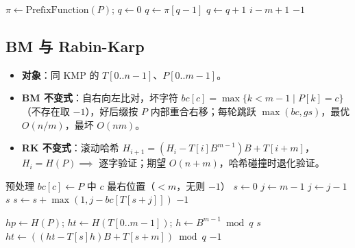 \begin{algorithm}[H]
\caption{KMP 匹配规约}
\begin{algorithmic}[1]
    \State $\pi\gets\text{PrefixFunction}(P)$; $q\gets0$
         $q\gets\pi[q-1]$ \EndWhile
         $q\gets q+1$ \EndIf
         \Return $i-m+1$  \EndIf
    \EndFor
    \State \Return $-1$
\EndProcedure
\end{algorithmic}
\end{algorithm}

\subsection{BM 与 Rabin-Karp}
\begin{itemize}
    \item \textbf{对象}：同 KMP 的 $T[0..n-1]$、$P[0..m-1]$。
    \item \textbf{BM 不变式}：自右向左比对，坏字符 $bc[c] = \max\{k < m-1 \mid P[k]=c\}$（不存在取 $-1$），好后缀按 $P$ 内部重合右移；每轮跳跃 $\max(bc, gs)$，最优 $O(n/m)$，最坏 $O(nm)$。
    \item \textbf{RK 不变式}：滚动哈希 $H_{i+1} = (H_i - T[i]B^{m-1})B + T[i+m]$，$H_i = H(P) \implies$ 逐字验证；期望 $O(n+m)$，哈希碰撞时退化验证。
\end{itemize}

\begin{algorithm}[H]
\caption{BM 坏字符规约}
\begin{algorithmic}[1]
\State 预处理 $bc[c]\gets P$ 中 $c$ 最右位置（$<m$，无则 $-1$）
    \State $s\gets0$
        \State $j\gets m-1$
         $j\gets j-1$ \EndWhile
         \Return $s$ \EndIf
        \State $s\gets s+\max(1, j-bc[T[s+j]])$
    \EndWhile
    \State \Return $-1$
\EndProcedure
\end{algorithmic}
\end{algorithm}

\begin{algorithm}[H]
\caption{Rabin-Karp 滚动哈希规约}
\begin{algorithmic}[1]
    \State $hp\gets H(P)$; $ht\gets H(T[0..m-1])$; $h\gets B^{m-1}\bmod q$
         \Return $s$ \EndIf
         $ht\gets((ht-T[s]h)B+T[s+m])\bmod q$ \EndIf
    \EndFor
    \State \Return $-1$
\EndProcedure
\end{algorithmic}
\end{algorithm}

